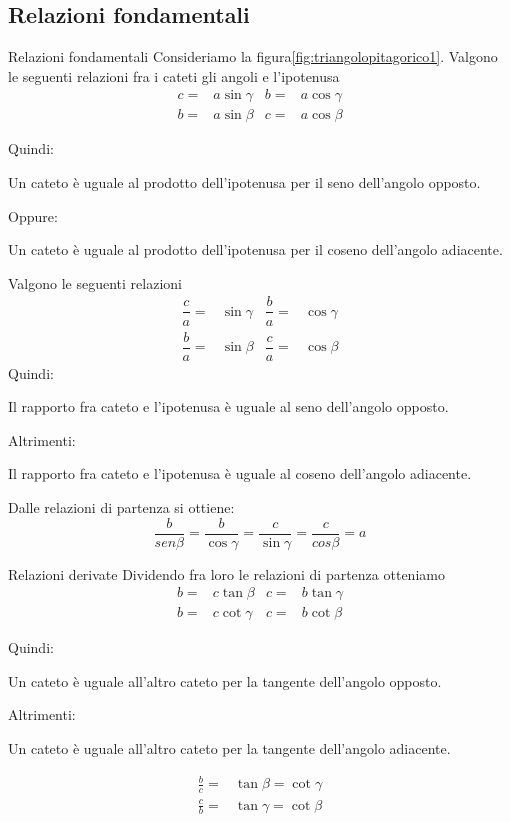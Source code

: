 \subsection{Relazioni fondamentali}
\begin{teoremat}{Relazioni fondamentali}{}
Consideriamo la figura\nobs\vref{fig:triangolopitagorico1}. Valgono le seguenti relazioni fra i cateti gli angoli e l'ipotenusa
\begin{align*}
c=&a\sin\gamma&b=&a\cos\gamma\\
b=&a\sin\beta&c=&a\cos\beta
\end{align*}
\end{teoremat}
\noindent Quindi:\par
Un cateto è uguale  al prodotto dell'ipotenusa per il seno dell'angolo opposto.\par 
\noindent Oppure:\par 
Un cateto è uguale al prodotto dell'ipotenusa per il coseno dell'angolo adiacente.\par
\noindent Valgono le seguenti relazioni
\begin{align*}
\dfrac{c}{a}=&\sin\gamma&\dfrac{b}{a}=&\cos\gamma\\
\dfrac{b}{a}=&\sin\beta&\dfrac{c}{a}=&\cos\beta
\end{align*}
\noindent Quindi:\par
Il rapporto fra  cateto e l'ipotenusa è uguale al seno dell'angolo opposto.\par
\noindent Altrimenti:\par
Il rapporto fra  cateto e l'ipotenusa è uguale al coseno dell'angolo adiacente.\par 
\noindent Dalle relazioni di partenza si ottiene:
\[\dfrac{b}{sen\beta}=\dfrac{b}{\cos\gamma}=\dfrac{c}{\sin\gamma}=\dfrac{c}{cos\beta}=a \]
\begin{teoremat}{Relazioni derivate}{}
Dividendo fra loro le relazioni di partenza otteniamo
\begin{align*}
b=&c\tan\beta&c=&b\tan\gamma\\
b=&c\cot\gamma&c=&b\cot\beta
\end{align*}
\end{teoremat}
\noindent Quindi:\par
Un cateto è uguale all'altro cateto per la tangente dell'angolo opposto.\par \noindent Altrimenti:\par 
Un cateto è uguale all'altro cateto per la tangente dell'angolo adiacente.\par
\begin{align*}
\frac{b}{c}=&\tan\beta=\cot\gamma\\
\frac{c}{b}=&\tan\gamma=\cot\beta
\end{align*}
